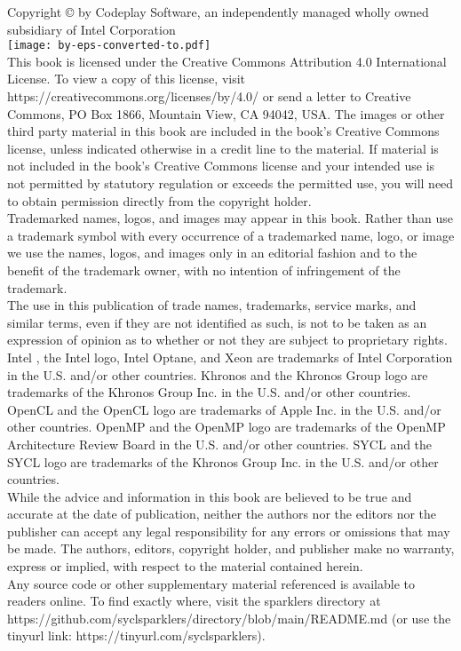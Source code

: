 {{Copyright © {\SparklerCopyRightYear} by Codeplay Software, an independently managed wholly owned subsidiary of Intel Corporation \\%
\texttt{[image: by-eps-converted-to.pdf]}\\ %
This book is licensed under the Creative Commons Attribution 4.0 International License. To view a copy of this license, visit {\tiny https://creativecommons.org/licenses/by/4.0/} or send a letter to Creative Commons, PO Box 1866, Mountain View, CA 94042, USA.
The images or other third party material in this book are included in the book’s Creative Commons license, unless indicated otherwise in a credit line to the material. If material is not included in the book’s Creative Commons license and your intended use is not permitted by statutory regulation or exceeds the permitted use, you will need to obtain permission directly from the copyright holder.\\ %

Trademarked names, logos, and images may appear in this book. Rather than use a trademark symbol with every occurrence of a trademarked name, logo, or image we use the names, logos, and images only in an editorial fashion and to the benefit of the trademark owner, with no intention of infringement of the trademark.\\ %
The use in this publication of trade names, trademarks, service marks, and similar terms, even if they are not identified as such, is not to be taken as an expression of opinion as to whether or not they are subject to proprietary rights.\\ %
Intel , the Intel logo, Intel Optane, and Xeon are trademarks of Intel Corporation in the U.S. and/or other countries. Khronos and the Khronos Group logo are trademarks of the Khronos Group Inc. in the U.S. and/or other countries. OpenCL and the OpenCL logo are trademarks of Apple Inc. in the U.S. and/or other countries. OpenMP and the OpenMP logo are trademarks of the OpenMP Architecture Review Board in the U.S. and/or other countries. SYCL and the SYCL logo are trademarks of the Khronos Group Inc. in the U.S. and/or other countries.\\ %

While the advice and information in this book are believed to be true and accurate at the date of publication, neither the authors nor the editors nor the publisher can accept any legal responsibility for any errors or omissions that may be made. The authors, editors, copyright holder, and publisher make no warranty, express or implied, with respect to the material contained herein.\\ %
Any source code or other supplementary material referenced is available to readers online. To find exactly where, visit the sparklers directory at {\tiny https://github.com/syclsparklers/directory/blob/main/README.md} (or use the tinyurl link: {\tiny https://tinyurl.com/syclsparklers}). \\%
}
}

